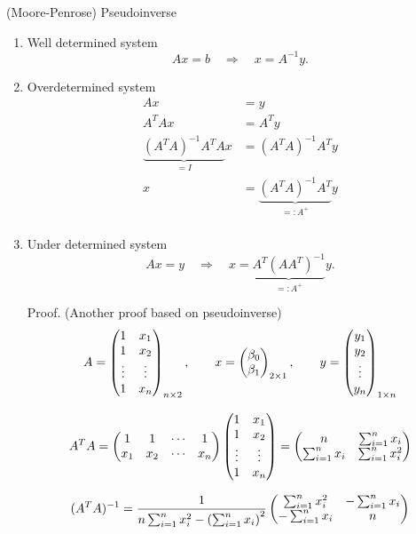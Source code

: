 \begin{frame}{(Moore-Penrose) Pseudoinverse}

	\begin{enumerate}
		\item Well determined system
			\[
				Ax = b \quad\Longrightarrow\quad x = A^{-1} y.
			\]
			\vfill
		\item Overdetermined system
			\begin{align*}
				Ax &= y\\
				A^T A x &= A^T y \\
				\underbrace{(A^T A)^{-1}A^T A}_{=I} x &= (A^T A)^{-1}A^T y \\
				x &= \underbrace{(A^T A)^{-1}A^T}_{=: A^+} y \\
			\end{align*}
			\vfill
		\item Under determined system
			\[
				Ax= y \quad\Longrightarrow\quad x = \underbrace{A^T(AA^T)^{-1}}_{=:A^+} y.
			\]
	\end{enumerate}
\end{frame}
\begin{frame}[fragile]

	\begin{enumerate}
		\item[Proof.] (Another proof based on pseudoinverse)
	\[
A =
\begin{pmatrix}
	1 & x_1\cr
	1 & x_2 \cr
	\vdots & \vdots \cr
	1 & x_n
\end{pmatrix}_{n\times 2}, \qquad
x =
\begin{pmatrix}
	\beta_0\cr
	\beta_1
\end{pmatrix}_{2\times 1},\qquad
y =
\begin{pmatrix}
	y_1\cr
	y_2\cr
	\vdots\cr
	y_n\cr
\end{pmatrix}_{1\times n}
	\]
	\vfill
\item[]
	\[
	A^T A =
	\begin{pmatrix}
		1 & 1 & \cdots & 1\cr
		x_1 & x_2 & \cdots & x_n \cr
\end{pmatrix}\begin{pmatrix}
	1 & x_1\cr
	1 & x_2 \cr
	\vdots & \vdots \cr
	1 & x_n
\end{pmatrix}
=
\begin{pmatrix}
	n & \sum_{i=1}^n x_i\cr
	\sum_{i=1}^n x_i & \sum_{i=1}^n x_i^2
\end{pmatrix}
	\]
\vfill
\item[]
\[
	(A^TA)^{-1}  =
\frac{1}{n\sum_{i=1}^n x_i^2-\left(\sum_{i=1}^n x_i\right)^2}
\begin{pmatrix}
	\sum_{i=1}^n x_i^2
 & -\sum_{i=1}^n x_i\cr
	-\sum_{i=1}^n x_i & n \end{pmatrix}
\]
\end{enumerate}
\end{frame}
